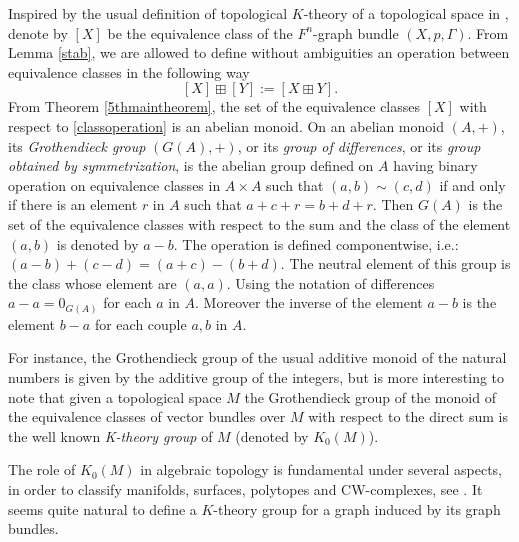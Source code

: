 \documentclass{amsart}
\theoremstyle{definition}
\numberwithin{equation}{section}
\begin{document}
Inspired by the usual definition of topological $K$-theory of a topological space in \cite[Chapter I, \S 11]{ttd}, denote by $[X]$ be the equivalence class of the $F^n$-graph bundle $(X, p, \Gamma)$. From Lemma \ref{stab}, we are allowed to define without ambiguities an operation between equivalence classes in the following way
\begin{equation}\label{classoperation}
    [X] \boxplus [Y] := [X \boxplus Y]. 
\end{equation}
From Theorem \ref{5thmaintheorem}, the set of the equivalence classes $[X]$ with respect to \eqref{classoperation} is an abelian monoid. On an abelian monoid $(A, +)$, its \textit{Grothendieck group} $(G(A),+)$, or its \textit{group of differences}, or its \textit{group obtained by symmetrization}, is the abelian group defined on  $A$ having binary operation on equivalence classes in $A \times A$ such that $(a,b) \sim (c,d)$ if and only if there is an element $r$ in $A$ such that $a + c + r = b + d + r$. Then $G(A)$ is the set of the equivalence classes with respect to the sum and the class of the element $(a,b)$ is denoted by $a - b$. The operation is defined componentwise, i.e.:     $(a-b)+(c-d) = (a+c) - (b+d).$ The neutral element of this group is the class whose element are $(a,a)$. Using the notation of differences   $a-a = 0_{G(A)}$ for each $a$ in $A$. Moreover the inverse of the element $a-b$ is the element $b-a$ for each couple $a,b$ in $A$. 


For instance, the Grothendieck group of the usual additive monoid of the natural numbers is given by the additive group of the integers, but is more interesting to note that given a topological space $M$ the Grothendieck group of the monoid of the equivalence classes of vector bundles over $M$ with respect to the direct sum is  the well known \textit{K-theory group} of $M$ (denoted by $K_0(M)$). 


The role of $K_0(M)$ in algebraic topology is fundamental under several aspects, in order to classify manifolds, surfaces, polytopes and CW-complexes, see \cite{ttd}. It seems quite natural to define a $K$-theory group for a graph induced by its graph bundles.

\end{document}

